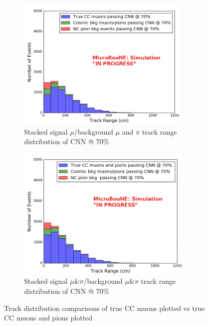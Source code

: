 \begin{figure}[htp!]
\centering
	\begin{subfigure}[b]{.45\textwidth}
	\includegraphics[width=\textwidth,height=2.5in]{figs/sel1mod_cnn_trackrange_mupi_acc70_0707.png}
	\caption{Stacked signal $\mu$/background $\mu$ and $\pi$ track range distribution of CNN @ 70\%}
	\end{subfigure}
	\quad
	\begin{subfigure}[b]{.45\textwidth}
	\includegraphics[width=\textwidth,height=2.5in]{figs/sel1mod_mupi_trackrange_acc70.png}
	\caption{Stacked signal $\mu \& \pi$/background $\mu \& \pi$ track range distribution of CNN @ 70\%}
	\label{fig:mupib}
	\end{subfigure}
	\quad
\caption{Track distribution comparisons of true CC muons plotted vs true CC muons and pions plotted}
\label{fig:mupi}
\end{figure}


